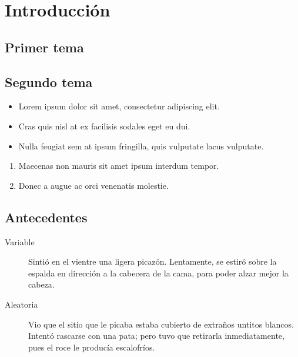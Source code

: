 \section{Introducción}
\subsection{Primer tema}
\lipsum[1]

\subsection{Segundo tema}
\lipsum[3]

\begin{itemize}
	\item Lorem ipsum dolor sit amet, consectetur adipiscing elit.
	\item Cras quis nisl at ex facilisis sodales eget eu dui.
	\item Nulla feugiat sem at ipsum fringilla, quis vulputate lacus vulputate.
\end{itemize}
\begin{enumerate}
	\item Maecenas non mauris sit amet ipsum interdum tempor.
	\item Donec a augue ac orci venenatis molestie.
\end{enumerate}

\subsection{Antecedentes}

\lipsum[4]

\begin{description}
	\item[Variable] Sintió en el vientre una ligera picazón. Lentamente, se estiró sobre la espalda en dirección a la cabecera de la cama, para poder alzar mejor la cabeza.
	\item[Aleatoria]  Vio que el sitio que le picaba estaba cubierto de extraños untitos blancos. Intentó rascarse con una pata; pero tuvo que retirarla inmediatamente, pues el roce le producía escalofríos.
\end{description}


